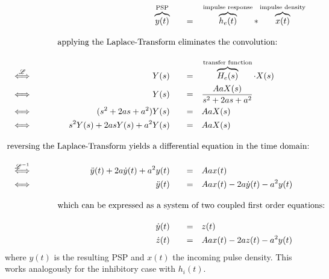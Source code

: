 \begin{alignat}{5}
    &                                           & &&          \overbrace{y(t)}^{\text{PSP}} \quad &&=& \quad \overbrace{h_e(t)}^{\text{impulse response}} \ast \overbrace{x(t)}^{\text{impulse density}} \label{eq:convolution} \\[1em]
    &                                           & \omit\rlap{applying the Laplace-Transform eliminates the convolution:}                 \nonumber \\[1em]
    &  \stackrel{\mathscr{L}}{\iff} \qquad      & &&                             Y(s) \quad &&=& \quad \overbrace{H_e(s)}^{\text{transfer function}} \cdot X(s)  \label{eq:laplace_domain} \\
    &  \iff                                     & &&                             Y(s) \quad &&=& \quad \frac{AaX(s)}{s^2+2as+a^2}  \nonumber \\
    &  \iff                                     & &&               (s^2+2as+a^2) Y(s) \quad &&=& \quad AaX(s) \nonumber \\
    &  \iff                                     & &&          s^{2}Y(s)+2asY(s)+a^{2}Y(s) \quad &&=& \quad AaX(s) \nonumber \\[1em]
    \omit\rlap{reversing the Laplace-Transform yields a differential equation in the time domain:}     \nonumber \\[1em]
    &  \stackrel{\mathscr{L}^{-1}}{\iff} \qquad & && \ddot{y}(t)+2a\dot{y}(t)+a^{2}y(t) \quad &&=& \quad Aax(t) \nonumber \\
    &  \iff                                     & &&                      \ddot{y}(t) \quad &&=& \quad Aax(t)-2a\dot{y}(t)-a^{2}y(t)  \label{eq:sec_ord_nmm} \\[1em]
    &                                           & \omit\rlap{which can be expressed as a system of two coupled first order equations:}                 \nonumber \\[1em]
    &                                           & &&                       \dot{y}(t) \quad &&=& \quad z(t)  \label{eq:y_t}\\
    &                                           & &&                       \dot{z}(t) \quad &&=& \quad Aax(t)-2az(t)-a^{2}y(t)   \label{eq:z_t}
\end{alignat}
where $y(t)$ is the resulting PSP and $x(t)$ the incoming pulse density.
This works analogously for the inhibitory case with $h_i(t)$.


